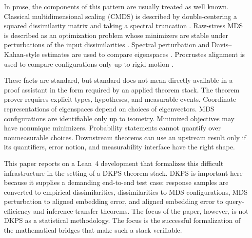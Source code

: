 \documentclass[11pt]{article}
\newcommand{\Lean}{Lean~4\xspace}
\begin{document}
In prose, the components of this pattern are usually treated as well known.
Classical multidimensional scaling (CMDS) is described by double-centering a
squared dissimilarity matrix and taking a spectral truncation
\cite{torgerson1952mds,gower1966distance}.  Raw-stress MDS is described as an
optimization problem whose minimizers are stable under perturbations of the
input dissimilarities \cite{kruskal1964mds}.  Spectral perturbation and
Davis--Kahan-style estimates are used to compare eigenspaces
\cite{davis1970rotation,yu2015davis,chen2021spectral}.  Procrustes alignment is
used to compare configurations only up to rigid motion \cite{goodall1991procrustes}.

These facts are standard, but standard does not mean directly available in a
proof assistant in the form required by an applied theorem stack.  The theorem
prover requires explicit types, hypotheses, and measurable events.  Coordinate
representations of eigenspaces depend on choices of eigenvectors.  MDS
configurations are identifiable only up to isometry.  Minimized objectives may
have nonunique minimizers.  Probability statements cannot quantify over
nonmeasurable choices.  Downstream theorems can use an upstream result only if
its quantifiers, error notion, and measurability interface have the right shape.

This paper reports on a \Lean development that formalizes this difficult
infrastructure in the setting of a DKPS theorem stack.  DKPS is important here
because it supplies a demanding end-to-end test case: response samples are
converted to empirical dissimilarities, dissimilarities to MDS configurations,
MDS perturbation to aligned embedding error, and aligned embedding error to
query-efficiency and inference-transfer theorems.  The focus of the paper,
however, is not DKPS as a statistical methodology.  The focus is the successful
formalization of the mathematical bridges that make such a stack verifiable.
\end{document}

